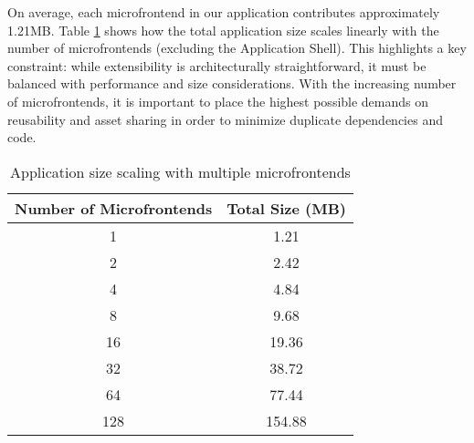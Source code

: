 On average, each microfrontend in our application contributes approximately 1.21MB. Table \ref{table:app-scaling} shows how the total application size scales linearly with the number of microfrontends (excluding the Application Shell). This highlights a key constraint: while extensibility is architecturally straightforward, it must be balanced with performance and size considerations. With the increasing number of microfrontends, it is important to place the highest possible demands on reusability and asset sharing in order to minimize duplicate dependencies and code.
\begin{table}[h]
    \centering
    \begin{tabular}{|c|c|}
        \hline
        \textbf{Number of Microfrontends} & \textbf{Total Size (MB)} \\
        \hline
        1 & 1.21 \\
        \hline
        2 & 2.42 \\
        \hline
        4 & 4.84 \\
        \hline
        8 & 9.68 \\
        \hline
        16 & 19.36 \\
        \hline
        32 & 38.72 \\
        \hline
        64 & 77.44 \\
        \hline
        128 & 154.88 \\
        \hline
    \end{tabular}
    \caption{Application size scaling with multiple microfrontends}
    \label{table:app-scaling}
\end{table}